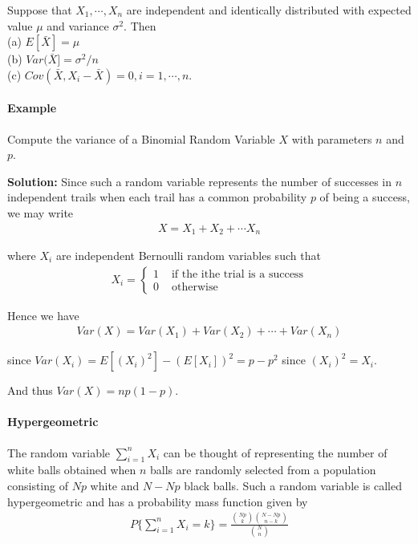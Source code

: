 \documentclass[10 pt,final]{article}
\newcommand{\impo}[1]{{\color{magenta} #1}}
\begin{document}
\begin{proposition}
Suppose that $X_1, \cdots, X_n$ are independent and identically distributed with expected value $\mu$ and variance $\sigma^2$. Then\\
(a) $E[\bar{X}] = \mu$ \\
(b) $Var(\bar{X}] = \sigma^2/n$ \\ 
(c) $Cov(\bar{X}, X_i - \bar{X}) = 0, i=1,\cdots, n.$
\end{proposition}

\paragraph{Example} Compute the variance of a \impo{Binomial Random Variable} $X$ with parameters $n$ and $p$.

\textbf{Solution:} Since such a random variable represents the number of successes in $n$ independent trails when each trail has a common probability $p$ of being a success, we may write
\begin{align*}
X = X_1 + X_2 + \cdots X_n
\end{align*}

where $X_i$ are independent \impo{Bernoulli random variables} such that 
\begin{align*}
X_i = 
\begin{cases}
1 & \mbox{ if the ithe trial is a success} \\
0 & \mbox{ otherwise}
\end{cases}
\end{align*}

Hence we have
\begin{align*}
Var(X) = Var(X_1) + Var(X_2) + \cdots + Var(X_n)
\end{align*}

since $Var(X_i) = E[(X_i)^2] - (E[X_i])^2 = p - p^2$ since $(X_i)^2 = X_i$.

And thus $Var(X) = np(1-p)$.

\paragraph{\impo{Hypergeometric}} The random variable $\sum^n_{i=1} X_i$ can be thought of representing the number of white balls obtained when $n$ balls are randomly selected from a population consisting of $Np$ white and $N-Np$ black balls. Such a random variable is called \impo{hypergeometric} and has a probability mass function given by 
\begin{align*}
P\{\sum^n_{i=1} X_i = k\} = \frac{\binom{Np}{k} \binom{N-Np}{n-k}}{\binom{N}{n}}
\end{align*}


\end{document}
